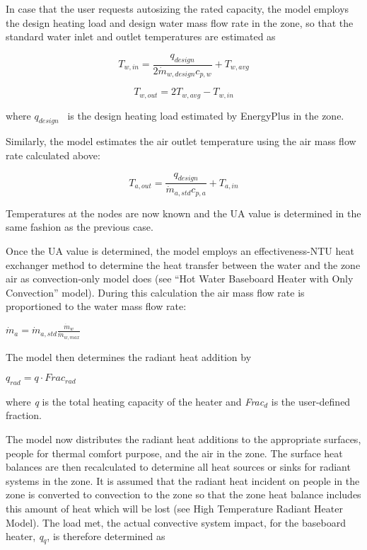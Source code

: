 In case that the user requests autosizing the rated capacity, the model employs the design heating load and design water mass flow rate in the zone, so that the standard water inlet and outlet temperatures are estimated as

\begin{equation}
{T_{w,in}} = \frac{{{q_{design}}}}{{2\dot m{}_{w,design}{c_{p,w}}}} + {T_{w,avg}}
\end{equation}

\begin{equation}
{T_{w,out}} = 2{T_{w,avg}} - {T_{w,in}}
\end{equation}

where \({q_{design}}\) ~is the design heating load estimated by EnergyPlus in the zone.

Similarly, the model estimates the air outlet temperature using the air mass flow rate calculated above:

\begin{equation}
{T_{a,out}} = \frac{{{q_{design}}}}{{\dot m_{a,std} {c_{p,a}}}} + {T_{a,in}}
\end{equation}

Temperatures at the nodes are now known and the UA value is determined in the same fashion as the previous case.

Once the UA value is determined, the model employs an effectiveness-NTU heat exchanger method to determine the heat transfer between the water and the zone air as convection-only model does (see ``Hot Water Baseboard Heater with Only Convection'' model). During this calculation the air mass flow rate is proportioned to the water mass flow rate:

$\dot{m}_a = \dot{m}_{a,std} \frac{\dot{m}_w}{\dot{m}_{w,max}}$

The model then determines the radiant heat addition by

$q_{rad} = q \cdot Frac_{rad}$

where \emph{q} is the total heating capacity of the heater and \emph{Frac\(_{d}\)} is the user-defined fraction.

The model now distributes the radiant heat additions to the appropriate surfaces, people for thermal comfort purpose, and the air in the zone. The surface heat balances are then recalculated to determine all heat sources or sinks for radiant systems in the zone. It is assumed that the radiant heat incident on people in the zone is converted to convection to the zone so that the zone heat balance includes this amount of heat which will be lost (see High Temperature Radiant Heater Model). The load met, the actual convective system impact, for the baseboard heater, \emph{q\(_{q}\)}, is therefore determined as

